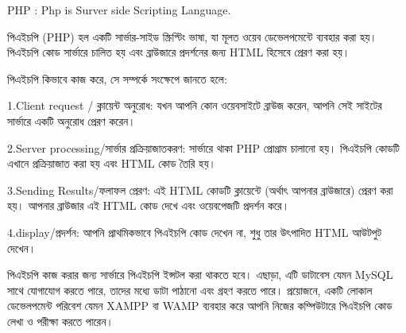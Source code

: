 PHP : Php is Surver side Scripting Language.

পিএইচপি (PHP) হল একটি সার্ভার-সাইড স্ক্রিপ্টিং ভাষা, যা মূলত ওয়েব ডেভেলপমেন্টে ব্যবহার করা হয়। পিএইচপি কোড সার্ভারে চালিত হয় এবং ব্রাউজারে প্রদর্শনের জন্য HTML হিসেবে প্রেরণ করা হয়।

পিএইচপি কিভাবে কাজ করে, সে সম্পর্কে সংক্ষেপে জানতে হলে:

1.Client request / ক্লায়েন্ট অনুরোধ: যখন আপনি কোন ওয়েবসাইটে ব্রাউজ করেন, আপনি সেই সাইটের সার্ভারে একটি অনুরোধ প্রেরণ করেন।

2.Server processing/সার্ভার প্রক্রিয়াজাতকরণ: সার্ভারে থাকা PHP প্রোগ্রাম চালানো হয়। পিএইচপি কোডটি এখানে প্রক্রিয়াজাত করা হয় এবং HTML কোড তৈরি হয়।

3.Sending Results/ফলাফল প্রেরণ: এই HTML কোডটি ক্লায়েন্টে (অর্থাৎ আপনার ব্রাউজারে) প্রেরণ করা হয়। আপনার ব্রাউজার এই HTML কোড দেখে এবং ওয়েবপেজটি প্রদর্শন করে।

4.display/প্রদর্শন: আপনি প্রাথমিকভাবে পিএইচপি কোড দেখেন না, শুধু তার উৎপাদিত HTML আউটপুট দেখেন।

পিএইচপি কাজ করার জন্য সার্ভারে পিএইচপি ইন্সটল করা থাকতে হবে। এছাড়া, এটি ডাটাবেস যেমন MySQL সাথে যোগাযোগ করতে পারে, তাদের মধ্যে ডাটা পাঠানো এবং গ্রহণ করতে পারে। প্রয়োজনে, একটি লোকাল ডেভেলপমেন্ট পরিবেশ যেমন XAMPP বা WAMP ব্যবহার করে আপনি নিজের কম্পিউটারে পিএইচপি কোড লেখা ও পরীক্ষা করতে পারেন।
